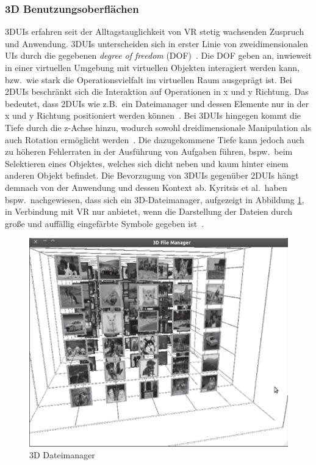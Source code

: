 \subsubsection{3D Benutzungsoberflächen}
3DUIs erfahren seit der Alltagstauglichkeit von VR stetig wachsenden Zuspruch und Anwendung. 3DUIs unterscheiden sich in erster Linie von zweidimensionalen UIs durch die gegebenen \textit{degree of freedom} (DOF)~\cite{whatuserinterfacetouse,asurveyon3dobjectmanipulation,theoryandpracticebook}. Die DOF geben an, inwieweit in einer virtuellen Umgebung mit virtuellen Objekten interagiert werden kann, bzw.~wie stark die Operationsvielfalt im virtuellen Raum ausgeprägt ist. Bei 2DUIs beschränkt sich die Interaktion auf Operationen in x und y Richtung. Das bedeutet, dass 2DUIs wie z.B.~ein Dateimanager und dessen Elemente nur in der x und y Richtung positioniert werden können~\cite{issuesandbenefitsofusing3d}. Bei 3DUIs hingegen kommt die Tiefe durch die z-Achse hinzu, wodurch sowohl dreidimensionale Manipulation als auch Rotation ermöglicht werden~\cite{anintroductionto3dspacial}. Die dazugekommene Tiefe kann jedoch auch zu höheren Fehlerraten in der Ausführung von Aufgaben führen, bspw.~beim Selektieren eines Objektes, welches sich dicht neben und kaum hinter einem anderen Objekt befindet. Die Bevorzugung von 3DUIs gegenüber 2DUIs hängt demnach von der Anwendung und dessen Kontext ab. Kyritsis et al.~haben bspw.~nachgewiesen, dass sich ein 3D-Dateimanager, aufgezeigt in Abbildung \ref{fig:3dinterface}, in Verbindung mit VR nur anbietet, wenn die Darstellung der Dateien durch große und auffällig eingefärbte Symbole gegeben ist~\cite{issuesandbenefitsofusing3d}.

\begin{figure}[h]
\captionsetup{width=.7\linewidth}
\includegraphics[scale=0.75]{Bilder/Hauptteil/3duserinterface}
\centering
\caption{3D Dateimanager~\cite[p.~243]{issuesandbenefitsofusing3d}}
\label{fig:3dinterface}
\end{figure}

